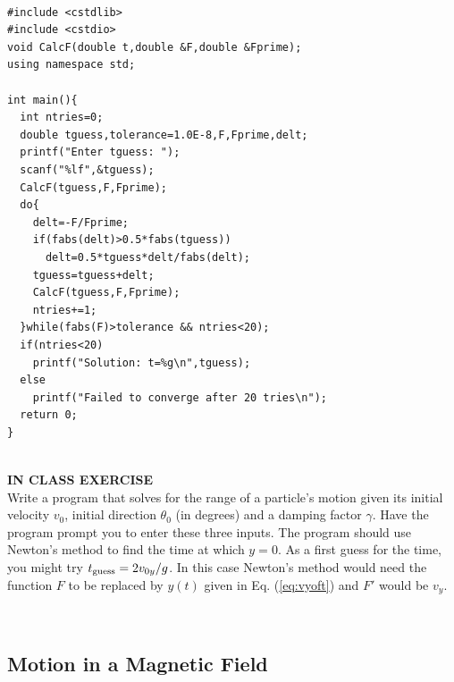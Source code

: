 {\tt
\begin{verbatim}
#include <cstdlib>
#include <cstdio>
void CalcF(double t,double &F,double &Fprime);
using namespace std;

int main(){
  int ntries=0;
  double tguess,tolerance=1.0E-8,F,Fprime,delt;
  printf("Enter tguess: ");
  scanf("%lf",&tguess);
  CalcF(tguess,F,Fprime);
  do{
    delt=-F/Fprime;
    if(fabs(delt)>0.5*fabs(tguess))
      delt=0.5*tguess*delt/fabs(delt);
    tguess=tguess+delt;
    CalcF(tguess,F,Fprime);
    ntries+=1;
  }while(fabs(F)>tolerance && ntries<20);
  if(ntries<20)
    printf("Solution: t=%g\n",tguess);
  else
    printf("Failed to converge after 20 tries\n");
  return 0;
}
\end{verbatim}}
\vspace*{-6pt}
\hrulefill\\
{\bf IN CLASS EXERCISE}\\
Write a program that solves for the range of a particle's motion given its initial velocity $v_0$, initial direction $\theta_0$ (in degrees) and a damping factor $\gamma$. Have the program prompt you to enter these three inputs. The program should use Newton's method to find the time at which $y=0$. As a first guess for the time, you might try $t_{\rm guess}=2v_{0y}/g$. In this case Newton's method would need the function $F$ to be replaced by $y(t)$ given in Eq. (\ref{eq:vyoft}) and $F'$ would be $v_y$. 

\hrulefill\\

\subsection{Motion in a Magnetic Field}
\label{sec:magnetic}

